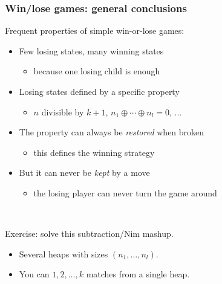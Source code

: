 \documentclass[12pt]{beamer}
\begin{document}
\begin{frame}
\frametitle{Win/lose games: general conclusions}
Frequent properties of simple win-or-lose games:
\begin{itemize}
\item Few losing states, many winning states
\begin{itemize} \item because one losing child is enough \end{itemize}
\item Losing states defined by a specific property
\begin{itemize} \item $n$ divisible by $k+1$, $n_1 \oplus \cdots \oplus n_l = 0$, ... \end{itemize}
\item The property can always be \emph{restored} when broken
\begin{itemize} \item this defines the winning strategy \end{itemize}
\item But it can never be \emph{kept} by a move
\begin{itemize} \item the losing player can never turn the game around \end{itemize}
\end{itemize}

~

Exercise: solve this subtraction/Nim mashup.
\begin{itemize}
\item Several heaps with sizes $(n_1,\ldots,n_l)$.
\item You can $1,2,\ldots,k$ matches from a single heap.
\end{itemize}
\end{frame}
\end{document}
